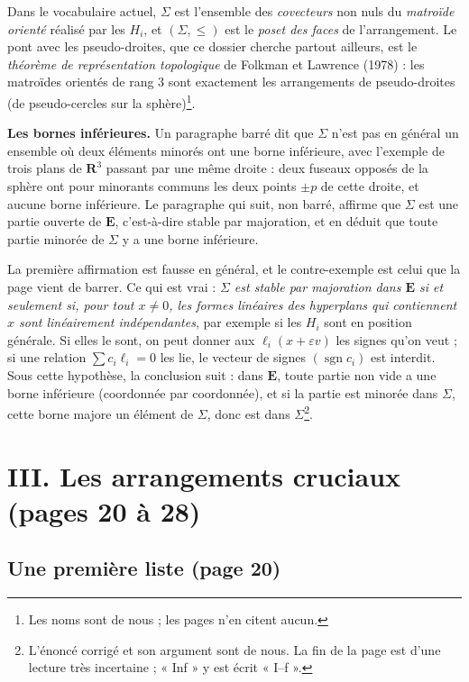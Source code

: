 \documentclass[11pt,a4paper]{article}
\begin{document}
Dans le vocabulaire actuel, $\Sigma$ est l'ensemble des \emph{covecteurs}
non nuls du \emph{matroïde orienté} réalisé par les $H_i$, et
$(\Sigma, \leqslant)$ est le \emph{poset des faces} de l'arrangement. Le pont
avec les pseudo-droites, que ce dossier cherche partout ailleurs, est le
\emph{théorème de représentation topologique} de Folkman et Lawrence (1978) :
les matroïdes orientés de rang $3$ sont exactement les arrangements de
pseudo-droites (de pseudo-cercles sur la sphère)\footnote{Les noms sont de
nous ; les pages n'en citent aucun.}.

\textbf{Les bornes inférieures.} Un paragraphe barré dit que $\Sigma$ n'est
pas en général un ensemble où deux éléments minorés ont une borne inférieure,
avec l'exemple de trois plans de $\mathbf{R}^3$ passant par une même droite :
deux fuseaux opposés de la sphère ont pour minorants communs les deux points
$\pm p$ de cette droite, et aucune borne inférieure. Le paragraphe qui suit,
non barré, affirme que $\Sigma$ est une partie ouverte de $\mathbf{E}$,
c'est-à-dire stable par majoration, et en déduit que toute partie minorée de
$\Sigma$ y a une borne inférieure.

La première affirmation est fausse en général, et le contre-exemple est
celui que la page vient de barrer. Ce qui est vrai : \emph{$\Sigma$ est
stable par majoration dans $\mathbf{E}$ si et seulement si, pour tout $x
\neq 0$, les formes linéaires des hyperplans qui contiennent $x$ sont
linéairement indépendantes}, par exemple si les $H_i$ sont en position
générale. Si elles le sont, on peut donner aux $\ell_i(x + \varepsilon v)$
les signes qu'on veut ; si une relation $\sum c_i \ell_i = 0$ les lie, le
vecteur de signes $(\operatorname{sgn} c_i)$ est interdit. Sous cette
hypothèse, la conclusion suit : dans $\mathbf{E}$, toute partie non vide a
une borne inférieure (coordonnée par coordonnée), et si la partie est minorée
dans $\Sigma$, cette borne majore un élément de $\Sigma$, donc est dans
$\Sigma$\footnote{L'énoncé corrigé et son argument sont de nous. La fin de
la page est d'une lecture très incertaine ; « Inf » y est écrit « I--f ».}.

\section*{III. Les arrangements cruciaux (pages 20 à 28)}

\subsection*{Une première liste (page 20)}
\end{document}
